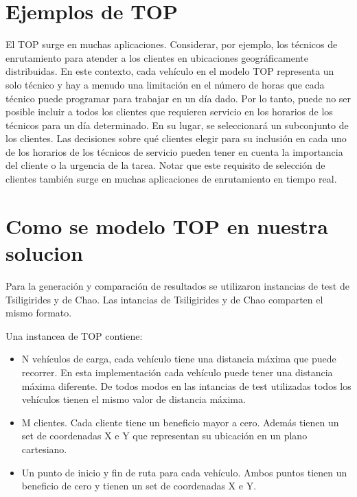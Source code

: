 \section{Ejemplos de TOP}

El TOP surge en muchas aplicaciones. Considerar, por ejemplo, los técnicos de enrutamiento para atender a los clientes en ubicaciones geográficamente distribuidas. En este contexto, cada vehículo en el modelo TOP representa un solo técnico y hay a menudo una limitación en el número de horas que cada técnico puede programar para trabajar en un día dado. Por lo tanto, puede no ser posible incluir a todos los clientes que requieren servicio en los horarios de los técnicos para un día determinado. En su lugar, se seleccionará un subconjunto de los clientes. Las decisiones sobre qué clientes elegir para su inclusión en cada uno de los horarios de los técnicos de servicio pueden tener en cuenta la importancia del cliente o la urgencia de la tarea. Notar que este requisito de selección de clientes también surge en muchas aplicaciones de enrutamiento en tiempo real.

\section{Como se modelo TOP en nuestra solucion}

Para la generación y comparación de resultados se utilizaron instancias de test de Tsiligirides y de Chao. Las intancias de Tsiligirides y de Chao comparten el mismo formato. 

\bigskip

\begin{minipage}{\textwidth}
Una instancea de TOP contiene:

\begin{itemize}
  \item N vehículos de carga, cada vehículo tiene una distancia máxima que puede recorrer. En esta implementación cada vehículo puede tener una distancia máxima diferente. De todos modos en las intancias de test utilizadas todos los vehículos tienen el mismo valor de distancia máxima.
  \item M clientes. Cada cliente tiene un beneficio mayor a cero. Además tienen un set de coordenadas X e Y que representan su ubicación en un plano cartesiano.
  \item Un punto de inicio y fin de ruta para cada vehículo. Ambos puntos tienen un beneficio de cero y tienen un set de coordenadas X e Y.
\end{itemize}
\end{minipage}

